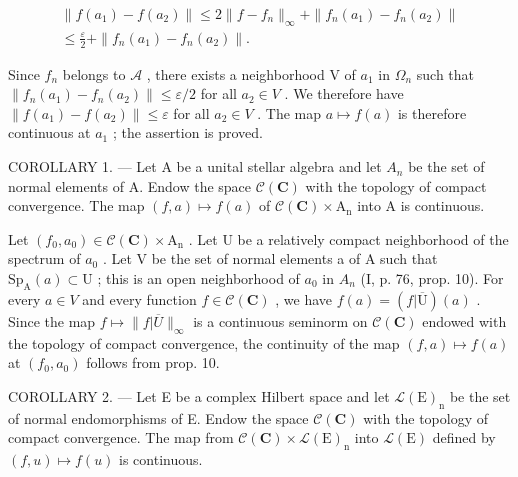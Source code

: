 \[
\begin{array}{c} \| f (a _ {1}) - f (a _ {2}) \| \leqslant 2 \| f - f _ {n} \| _ {\infty} + \| f _ {n} (a _ {1}) - f _ {n} (a _ {2}) \| \\ \leqslant \frac {\varepsilon}{2} + \| f _ {n} (a _ {1}) - f _ {n} (a _ {2}) \|. \end{array}
\]

Since \(f_n\) belongs to \(\mathcal{A}\) , there exists a neighborhood V of \(a_1\) in \(\Omega_n\) such that \(\| f_n(a_1) - f_n(a_2) \| \leqslant \varepsilon / 2\) for all \(a_2 \in V\) . We therefore have \(\| f(a_1) - f(a_2) \| \leqslant \varepsilon\) for all \(a_2 \in V\) . The map \(a \mapsto f(a)\) is therefore continuous at \(a_1\) ; the assertion is proved.

COROLLARY 1. --- Let A be a unital stellar algebra and let \(A_{n}\) be the set of normal elements of A. Endow the space \(\mathcal{C}(\mathbf{C})\) with the topology of compact convergence. The map \((f,a)\mapsto f(a)\) of \(\mathcal{C}(\mathbf{C})\times\mathrm{A}_{\mathrm{n}}\) into A is continuous.

Let \((f_{0}, a_{0}) \in \mathcal{C}(\mathbf{C}) \times \mathrm{A}_{\mathrm{n}}\) . Let U be a relatively compact neighborhood of the spectrum of \(a_{0}\) . Let V be the set of normal elements a of A such that \(\mathrm{Sp}_{\mathrm{A}}(a) \subset \mathrm{U}\) ; this is an open neighborhood of \(a_{0}\) in \(A_{n}\) (I, p. 76, prop. 10). For every \(a \in V\) and every function \(f \in \mathcal{C}(\mathbf{C})\) , we have \(f(a) = (f|\overline{\mathrm{U}})(a)\) . Since the map \(f \mapsto \|f|\overline{U}\|_{\infty}\) is a continuous seminorm on \(\mathcal{C}(\mathbf{C})\) endowed with the topology of compact convergence, the continuity of the map \((f, a) \mapsto f(a)\) at \((f_{0}, a_{0})\) follows from prop. 10.

COROLLARY 2. --- Let E be a complex Hilbert space and let \(\mathcal{L}(\mathrm{E})_{\mathrm{n}}\) be the set of normal endomorphisms of E. Endow the space \(\mathcal{C}(\mathbf{C})\) with the topology of compact convergence. The map from \(\mathcal{C}(\mathbf{C}) \times \mathcal{L}(\mathrm{E})_{\mathrm{n}}\) into \(\mathcal{L}(\mathrm{E})\) defined by \((f, u) \mapsto f(u)\) is continuous.

